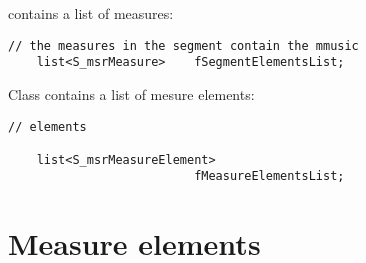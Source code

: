  contains a list of measures:
\begin{lstlisting}[language=CPlusPlus]
    // the measures in the segment contain the mmusic
    list<S_msrMeasure>    fSegmentElementsList;
\end{lstlisting}

Class {\tt } contains a list of mesure elements:
\begin{lstlisting}[language=CPlusPlus]
    // elements

    list<S_msrMeasureElement>
                          fMeasureElementsList;
\end{lstlisting}


\section{Measure elements}

